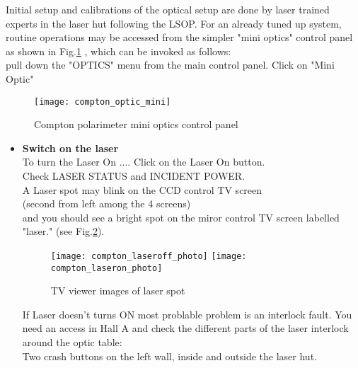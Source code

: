 {Initial setup and calibrations of the optical setup are done by laser trained experts in the laser hut following the LSOP\cite{compton_LSOP}. For an already tuned up system, routine operations  may be accessed from the simpler "mini optics" control panel as shown in  Fig.\ref{fig:compton_optic_mini} , which can be invoked as follows: \\ 

\noindent pull down the "OPTICS" menu from the main control panel. Click on "Mini Optic" 

\begin{figure}[htp]
    \begin{center}
        \texttt{[image: compton\_optic\_mini]}
     \end{center}
    \caption[compton:epics mini control]{Compton polarimeter mini optics control panel }
    \label{fig:compton_optic_mini}
 \end{figure}

\begin{itemize}
\item {\bf Switch on the laser}\\

To turn the Laser On .... Click on the Laser On button.\\
        Check LASER STATUS and INCIDENT POWER.\\
        A Laser spot may blink on the CCD control TV screen\\ 
	(second from left among the 4 screens)\\
        and you should see a bright spot on the miror control TV screen labelled "laser." 
	(see Fig.\ref{fig:compton_laser_photo}).
 \begin{figure}[htp]
    \begin{center}
        \texttt{[image: compton\_laseroff\_photo]}
        \texttt{[image: compton\_laseron\_photo]}
    \end{center}
    \caption[compton:laser spot]{TV viewer images of laser spot }
    \label{fig:compton_laser_photo}
 \end{figure}

        If Laser doesn't turns ON most problable problem is an interlock
        fault.
        You need an access in Hall A and check the different parts of the
        laser interlock around the optic table:\\
        Two crash buttons on the left wall, inside and outside the laser hut.
        \\
	

\end{itemize}}
